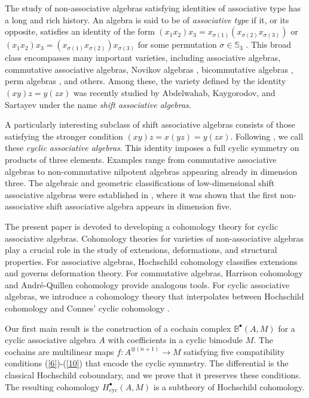 \documentclass[pdflatex,sn-mathphys-num]{sn-jnl}%
\theoremstyle{thmstyleone}%
\theoremstyle{thmstyletwo}%
\theoremstyle{thmstylethree}%
\begin{document}
The study of non-associative algebras satisfying identities of associative type has a long and rich history. An algebra is said to be of \textit{associative type} if it, or its opposite, satisfies an identity of the form $(x_1x_2)x_3 = x_{\sigma(1)}(x_{\sigma(2)}x_{\sigma(3)})$ or $(x_1x_2)x_3 = (x_{\sigma(1)}x_{\sigma(2)})x_{\sigma(3)}$ for some permutation $\sigma \in \mathbb{S}_3$ \cite{Abdelwahab2025}. This broad class encompasses many important varieties, including associative algebras, commutative associative algebras, Novikov algebras \cite{Dotsenko2023, Sartayev2023}, bicommutative algebras \cite{Drensky2024, Ismailov2024}, perm algebras \cite{Kaygorodov2024, Mashurov2024}, and others. Among these, the variety defined by the identity $(xy)z = y(zx)$ was recently studied by Abdelwahab, Kaygorodov, and Sartayev \cite{Abdelwahab2025} under the name \textit{shift associative algebras}.

A particularly interesting subclass of shift associative algebras consists of those satisfying the stronger condition $(xy)z = x(yz) = y(zx)$. Following \cite{Abdelwahab2025}, we call these \textit{cyclic associative algebras}. This identity imposes a full cyclic symmetry on products of three elements. Examples range from commutative associative algebras to non-commutative nilpotent algebras appearing already in dimension three. The algebraic and geometric classifications of low-dimensional shift associative algebras were established in \cite{Abdelwahab2025}, where it was shown that the first non-associative shift associative algebra appears in dimension five.

The present paper is devoted to developing a cohomology theory for cyclic associative algebras. Cohomology theories for varieties of non-associative algebras play a crucial role in the study of extensions, deformations, and structural properties. For associative algebras, Hochschild cohomology \cite{Hochschild1945} classifies extensions and governs deformation theory. For commutative algebras, Harrison cohomology and André-Quillen cohomology provide analogous tools. For cyclic associative algebras, we introduce a cohomology theory that interpolates between Hochschild cohomology and Connes' cyclic cohomology \cite{Connes1985}.

Our first main result is the construction of a cochain complex $\mathbb{B}^\bullet(A, M)$ for a cyclic associative algebra $A$ with coefficients in a cyclic bimodule $M$. The cochains are multilinear maps $f: A^{\otimes (n+1)} \to M$ satisfying five compatibility conditions (\ref{6})-(\ref{10}) that encode the cyclic symmetry. The differential is the classical Hochschild coboundary, and we prove that it preserves these conditions. The resulting cohomology $H^\bullet_{\mathrm{cyc}}(A, M)$ is a subtheory of Hochschild cohomology.
\end{document}
